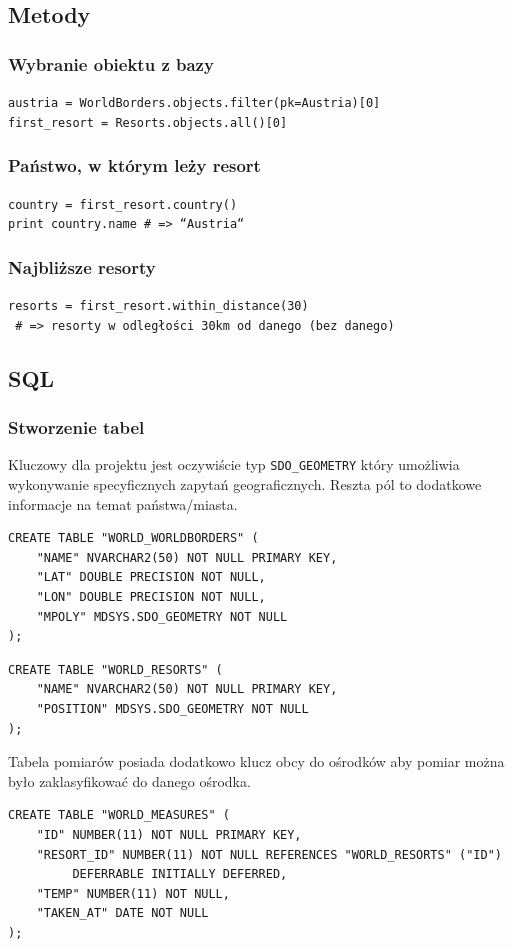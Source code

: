 \documentclass[12pt]{article}
\begin{document}
\subsection{Metody}
\subsubsection{Wybranie obiektu z bazy}
\texttt{austria = WorldBorders.objects.filter(pk=Austria)[0]} \\
\texttt{first\_resort = Resorts.objects.all()[0]}

\subsubsection{Państwo, w którym leży resort}
\texttt{country = first\_resort.country()} \\
\texttt{print country.name \# => ``Austria``}

\subsubsection{Najbliższe resorty}
\texttt{resorts = first\_resort.within\_distance(30)} \\
\texttt{  \# => resorty w odległości 30km od danego (bez danego)}

\subsection{SQL}
\subsubsection{Stworzenie tabel}
Kluczowy dla projektu jest oczywiście typ \texttt{SDO\_GEOMETRY} który umożliwia wykonywanie
specyficznych zapytań geograficznych. Reszta pól to dodatkowe informacje na temat państwa/miasta.
\begin{verbatim}
CREATE TABLE "WORLD_WORLDBORDERS" (
    "NAME" NVARCHAR2(50) NOT NULL PRIMARY KEY,
    "LAT" DOUBLE PRECISION NOT NULL,
    "LON" DOUBLE PRECISION NOT NULL,
    "MPOLY" MDSYS.SDO_GEOMETRY NOT NULL
);
\end{verbatim}

\begin{verbatim}
CREATE TABLE "WORLD_RESORTS" (
    "NAME" NVARCHAR2(50) NOT NULL PRIMARY KEY,
    "POSITION" MDSYS.SDO_GEOMETRY NOT NULL
);
\end{verbatim}

Tabela pomiarów posiada dodatkowo klucz obcy do ośrodków aby pomiar można było zaklasyfikować do
danego ośrodka.
\begin{verbatim}
CREATE TABLE "WORLD_MEASURES" (
    "ID" NUMBER(11) NOT NULL PRIMARY KEY,
    "RESORT_ID" NUMBER(11) NOT NULL REFERENCES "WORLD_RESORTS" ("ID")
         DEFERRABLE INITIALLY DEFERRED,
    "TEMP" NUMBER(11) NOT NULL,
    "TAKEN_AT" DATE NOT NULL
);
\end{verbatim}
\end{document}
